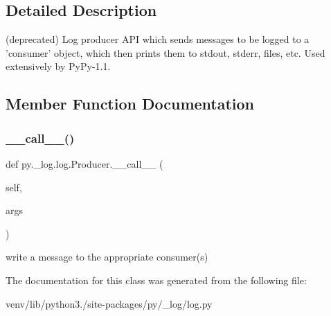 \subsection{Detailed Description}
\begin{DoxyVerb}(deprecated) Log producer API which sends messages to be logged
    to a 'consumer' object, which then prints them to stdout,
    stderr, files, etc. Used extensively by PyPy-1.1.
\end{DoxyVerb}
 

\subsection{Member Function Documentation}
\mbox{\label{classpy_1_1__log_1_1log_1_1_producer_a2fe1c3ecb78caaeaa72ddebb9e7ff410}} 
\subsubsection{\texorpdfstring{\+\_\+\+\_\+call\+\_\+\+\_\+()}{\_\_call\_\_()}}
{\footnotesize\ttfamily def py.\+\_\+log.\+log.\+Producer.\+\_\+\+\_\+call\+\_\+\+\_\+ (\begin{DoxyParamCaption}\item[{}]{self,  }\item[{}]{args }\end{DoxyParamCaption})}

\begin{DoxyVerb}write a message to the appropriate consumer(s) \end{DoxyVerb}
 

The documentation for this class was generated from the following file\+:\begin{DoxyCompactItemize}
\item 
venv/lib/python3./site-\/packages/py/\+\_\+log/log.\+py\end{DoxyCompactItemize}
